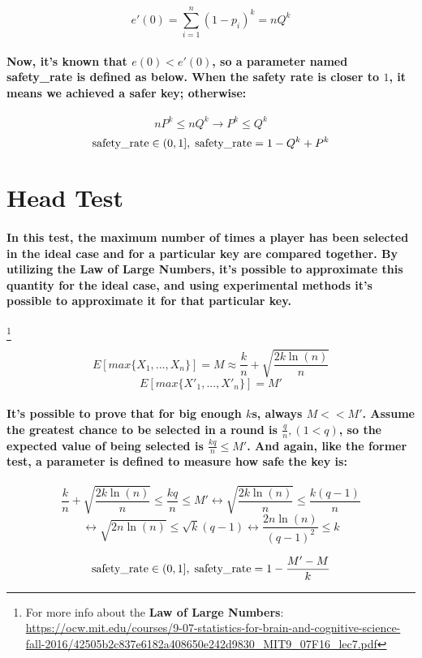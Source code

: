 \documentclass[oneside]{book}
\newcommand{\myparagraph}[1]{\paragraph{\textnormal{#1}}}
\begin{document}
$$e'(0) = \sum_{i=1}^{n} (1 - p_i)^k = n Q^k$$

\myparagraph{
Now, it's known that $e(0) < e'(0)$, so a parameter named safety\_rate is defined as below. When the safety rate is closer to $1$, it means we achieved a safer key; otherwise:
}

$$nP^k \le nQ^k \rightarrow P^k \le Q^k$$
$$\textnormal{safety\_rate} \in (0, 1], \; \textnormal{safety\_rate} = 1-Q^k+P^k$$

\section{Head Test}

\myparagraph{
In this test, the maximum number of times a player has been selected in the ideal case and for a particular key are compared together. By utilizing the \textbf{Law of Large Numbers}, it's possible to approximate this quantity for the ideal case, and using experimental methods it's possible to approximate it for that particular key.
}
\footnote{
For more info about the \textbf{Law of Large Numbers}:\newline
\href{https://ocw.mit.edu/courses/9-07-statistics-for-brain-and-cognitive-science-fall-2016/42505b2c837e6182a408650e242d9830_MIT9_07F16_lec7.pdf}{https://ocw.mit.edu/courses/9-07-statistics-for-brain-and-cognitive-science-fall-2016/42505b2c837e6182a408650e242d9830\_MIT9\_07F16\_lec7.pdf}
}

$$E[max\{X_1, ..., X_n\}] = M \approx  \frac{k}{n} + \sqrt{\frac{2k \ln(n)}{n}}$$
$$E[max\{X'_1, ..., X'_n\}] = M'$$

\myparagraph{
It's possible to prove that for big enough $k$s, always $M << M'$. Assume the greatest chance to be selected in a round is $\frac{q}{n}, (1 < q)$, so the expected value of being selected is $\frac{kq}{n} \le M'$. And again, like the former test, a parameter is defined to measure how safe the key is:
}

$$\frac{k}{n} + \sqrt{\frac{2k \ln(n)}{n}} \le \frac{kq}{n} \le M' \leftrightarrow \sqrt{\frac{2k \ln(n)}{n}} \le \frac{k(q-1)}{n}$$
$$\leftrightarrow \sqrt{2 n \ln(n)} \le \sqrt{k} (q-1) \leftrightarrow \frac{2n \ln(n)}{(q-1)^2} \le k$$

$$\textnormal{safety\_rate} \in (0, 1], \; \textnormal{safety\_rate} = 1 - \frac{M' - M}{k}$$
\end{document}
